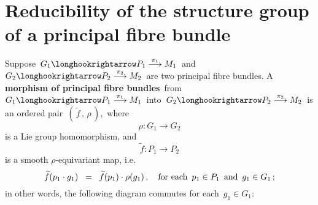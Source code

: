 

\section{Reducibility of the structure group of a principal fibre bundle}
\setcounter{theorem}{0}
\setcounter{equation}{0}


\renewcommand{\theenumi}{\roman{enumi}}
\renewcommand{\labelenumi}{\textnormal{(\theenumi)}$\;\;$}


\begin{definition}
\mbox{}
\vskip 0.2cm
\noindent
Suppose
\,$G_{1} \longhookrightarrow P_{1} \overset{\pi_{1}}{\longrightarrow} M_{1}$\, and
\,$G_{2} \longhookrightarrow P_{2} \overset{\pi_{2}}{\longrightarrow} M_{2}$\,
are two principal fibre bundles.
\vskip 0.1cm
\noindent
	A \,\textbf{morphism of principal fibre bundles}\, from
	\,$G_{1} \longhookrightarrow P_{1} \overset{\pi_{1}}{\longrightarrow} M_{1}$\,
	into
	\,$G_{2} \longhookrightarrow P_{2} \overset{\pi_{2}}{\longrightarrow} M_{2}$\,
	is an ordered pair
	\,$\left(\,\widetilde{f}\,,\,\rho\,\right)$,\,
	where
	\begin{equation*}
	\rho : G_{1} \longrightarrow G_{2}
	\end{equation*}
	is a Lie group homomorphism, and
	\begin{equation*}
	\widetilde{f} : P_{1} \longrightarrow P_{2}
	\end{equation*}
	is a smooth $\rho$-equivariant map, i.e. 
	\begin{equation*}
	\widetilde{f}(p_{1} \cdot g_{1})
	\;\; = \;\;
		\widetilde{f}(p_{1}) \cdot \rho(g_{1})\,,
	\quad
	\textnormal{for each \,$p_{1} \in P_{1}$\, and \,$g_{1} \in G_{1}$}\,;
	\end{equation*}
	in other words, the following diagram commutes for each \,$g_{1} \in G_{1}$:
	\begin{center}
	\end{center}
\end{definition}

